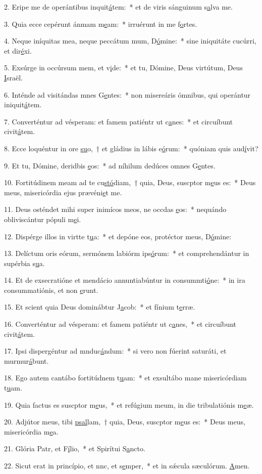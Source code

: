 2. Eripe me de operántibus inquit\uline{á}tem:~* et de viris sánguinum s\uline{a}lva me.\par 
3. Quia ecce cepérunt ánmam m\uline{e}am:~* irruérunt in me f\uline{o}rtes.\par 
4. Neque iníquitas mea, neque peccátum mum, D\uline{ó}mine:~* sine iniquitáte cucúrri, et dir\uline{é}xi.\par 
5. Exsúrge in occúrsum mem, et v\uline{i}de:~* et tu, Dómine, Deus virtútum, Deus \uline{I}sraël.\par 
6. Inténde ad visitándas mnes G\uline{e}ntes:~* non misereáris ómnibus, qui operántur iniquit\uline{á}tem.\par 
7. Converténtur ad vésperam: et famem patiéntr ut c\uline{a}nes:~* et circuíbunt civit\uline{á}tem.\par 
8. Ecce loquéntur in ore \uline{su}o,~† et gládius in lábis e\uline{ó}rum:~* quóniam quis aud\uline{í}vit?\par 
9. Et tu, Dómine, deridbis \uline{e}os:~* ad níhilum dedúces omnes G\uline{e}ntes.\par 
10. Fortitúdinem meam ad te cu\uline{stó}diam,~† quia, Deus, suscptor m\uline{e}us es:~* Deus meus, misericórdia ejus prævéni\uline{e}t me.\par 
11. Deus osténdet mihi super inimícos meos, ne occdas \uline{e}os:~* nequándo obliviscántur pópuli m\uline{e}i.\par 
12. Dispérge illos in virtte t\uline{u}a:~* et depóne eos, protéctor meus, D\uline{ó}mine:\par 
13. Delíctum oris eórum, sermónem labiórm ips\uline{ó}rum:~* et comprehendántur in supérbia s\uline{u}a.\par 
14. Et de exsecratióne et mendácio annuntiabúntur in consummti\uline{ó}ne:~* in ira consummatiónis, et non \uline{e}runt.\par 
15. Et scient quia Deus dominábtur J\uline{a}cob:~* et fínium t\uline{e}rræ.\par 
16. Converténtur ad vésperam: et famem patiéntr ut c\uline{a}nes,~* et circuíbunt civit\uline{á}tem.\par 
17. Ipsi dispergéntur ad mnduc\uline{á}ndum:~* si vero non fúerint saturáti, et murmur\uline{á}bunt.\par 
18. Ego autem cantábo fortitúdnem t\uline{u}am:~* et exsultábo mane misericórdiam t\uline{u}am.\par 
19. Quia factus es suscptor m\uline{e}us,~* et refúgium meum, in die tribulatiónis m\uline{e}æ.\par 
20. Adjútor meus, tibi \uline{psal}lam,~† quia, Deus, suscptor m\uline{e}us es:~* Deus meus, misericórdia m\uline{e}a.\par 
21. Glória Patr, et F\uline{í}lio,~* et Spirítui S\uline{a}ncto.\par 
22. Sicut erat in princípio, et nnc, et s\uline{e}mper,~* et in sǽcula sæculórum. \uline{A}men.\par 
